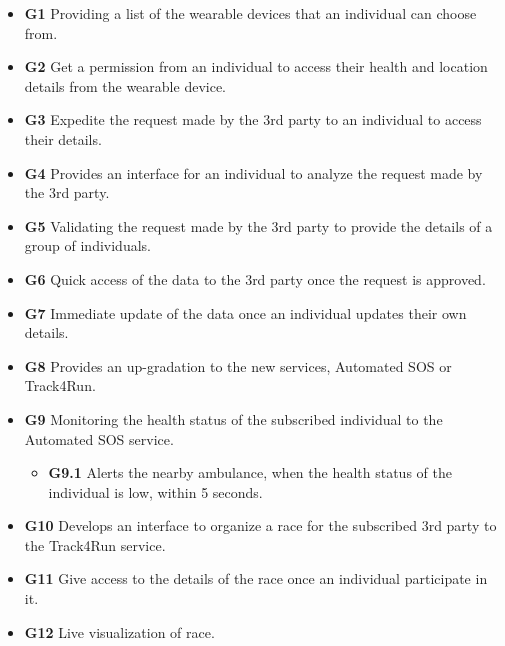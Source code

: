 \begin{itemize}
\item \textbf{G1} Providing a list of the wearable devices that an individual can choose from.
\item \textbf{G2} Get a permission from an individual to access their health and location details from the wearable device.
\item \textbf{G3} Expedite the request made by the 3rd party to an individual to access their details.
\item \textbf{G4} Provides an interface for an individual to analyze the request made by the 3rd party.
\item \textbf{G5} Validating the request made by the 3rd party to provide the details of a group of individuals.
\item \textbf{G6} Quick access of the data to the 3rd party once the request is approved.
\item \textbf{G7} Immediate update of the data once an individual updates their own details.
\item \textbf{G8} Provides an up-gradation to the new services, Automated SOS or Track4Run.
\item \textbf{G9} Monitoring the health status of the subscribed individual to the Automated SOS service.
\begin{itemize}
\item \textbf{G9.1} Alerts the nearby ambulance, when the health status of the individual is low, within 5 seconds.
\end{itemize}
\item \textbf{G10} Develops an interface to organize a race for the subscribed 3rd party to the Track4Run service.
\item \textbf{G11} Give access to the details of the race once an individual participate in it.
\item \textbf{G12} Live visualization of race.
\end{itemize}


